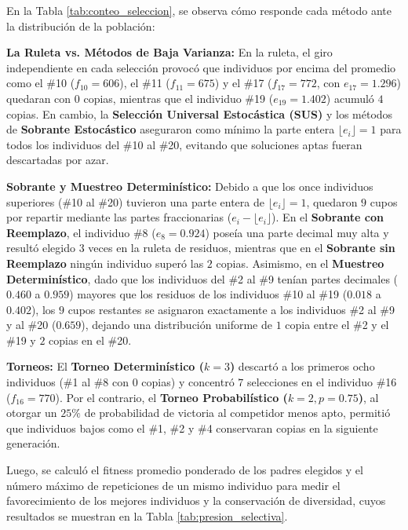 \documentclass[11pt,letterpaper]{article}
\begin{document}
En la Tabla \ref{tab:conteo_seleccion}, se observa cómo responde cada método ante la distribución de la población:

\textbf{La Ruleta vs. Métodos de Baja Varianza:} En la ruleta, el giro independiente en cada selección provocó que individuos por encima del promedio como el \#10 ($f_{10} = 606$), el \#11 ($f_{11} = 675$) y el \#17 ($f_{17} = 772$, con $e_{17} = 1.296$) quedaran con $0$ copias, mientras que el individuo \#19 ($e_{19} = 1.402$) acumuló $4$ copias. En cambio, la \textbf{Selección Universal Estocástica (SUS)} y los métodos de \textbf{Sobrante Estocástico} aseguraron como mínimo la parte entera $\lfloor e_i \rfloor = 1$ para todos los individuos del \#10 al \#20, evitando que soluciones aptas fueran descartadas por azar.


\textbf{Sobrante y Muestreo Determinístico:} Debido a que los once individuos superiores (\#10 al \#20) tuvieron una parte entera de $\lfloor e_i \rfloor = 1$, quedaron $9$ cupos por repartir mediante las partes fraccionarias ($e_i - \lfloor e_i \rfloor$). En el \textbf{Sobrante con Reemplazo}, el individuo \#8 ($e_8 = 0.924$) poseía una parte decimal muy alta y resultó elegido $3$ veces en la ruleta de residuos, mientras que en el \textbf{Sobrante sin Reemplazo} ningún individuo superó las $2$ copias. Asimismo, en el \textbf{Muestreo Determinístico}, dado que los individuos del \#2 al \#9 tenían partes decimales ($0.460$ a $0.959$) mayores que los residuos de los individuos \#10 al \#19 ($0.018$ a $0.402$), los $9$ cupos restantes se asignaron exactamente a los individuos \#2 al \#9 y al \#20 ($0.659$), dejando una distribución uniforme de $1$ copia entre el \#2 y el \#19 y $2$ copias en el \#20.


\textbf{Torneos:} El \textbf{Torneo Determinístico ($k=3$)} descartó a los primeros ocho individuos (\#1 al \#8 con $0$ copias) y concentró $7$ selecciones en el individuo \#16 ($f_{16} = 770$). Por el contrario, el \textbf{Torneo Probabilístico ($k=2, p=0.75$)}, al otorgar un $25\%$ de probabilidad de victoria al competidor menos apto, permitió que individuos bajos como el \#1, \#2 y \#4 conservaran copias en la siguiente generación.


Luego, se calculó el fitness promedio ponderado de los padres elegidos y el número máximo de repeticiones de un mismo individuo para medir el favorecimiento de los mejores individuos y la conservación de diversidad, cuyos resultados se muestran en la Tabla \ref{tab:presion_selectiva}.
\end{document}
